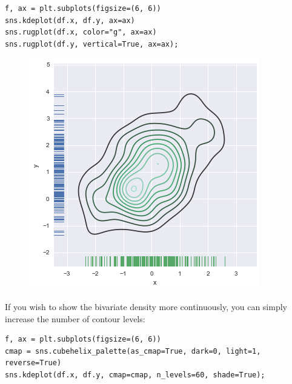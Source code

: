 \documentclass{beamer}
\begin{document}
\begin{frame}[fragile]
\begin{framed}
	\begin{verbatim}
f, ax = plt.subplots(figsize=(6, 6))
sns.kdeplot(df.x, df.y, ax=ax)
sns.rugplot(df.x, color="g", ax=ax)
sns.rugplot(df.y, vertical=True, ax=ax);
\end{verbatim}
\end{framed}
\begin{figure}
\centering
\includegraphics[width=0.7\linewidth]{images/distributions_36_0}
\end{figure}

\end{frame}
\begin{frame}[fragile]
	\large
If you wish to show the bivariate density more continuously, you can simply increase the number of contour levels:
\begin{verbatim}
f, ax = plt.subplots(figsize=(6, 6))
cmap = sns.cubehelix_palette(as_cmap=True, dark=0, light=1, reverse=True)
sns.kdeplot(df.x, df.y, cmap=cmap, n_levels=60, shade=True);
\end{verbatim}
\end{frame}
\end{document}
